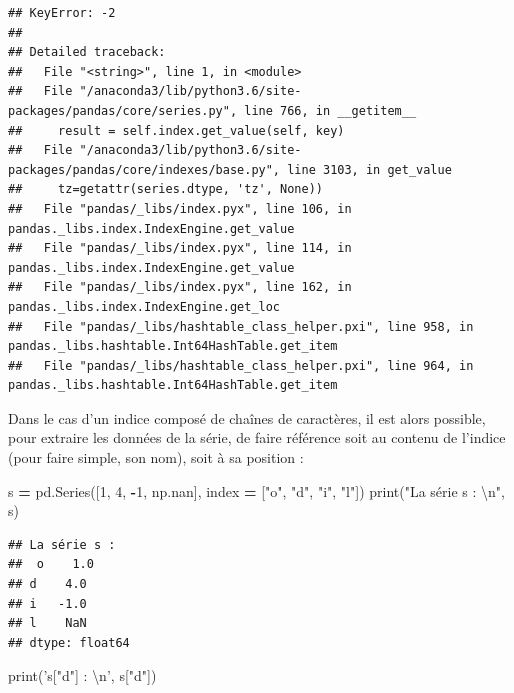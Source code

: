\documentclass[12pt,]{book}
\newenvironment{Shaded}{\begin{snugshade}}{\end{snugshade}}
\newcommand{\DecValTok}[1]{\textcolor[rgb]{0.00,0.00,0.81}{#1}}
\newcommand{\CharTok}[1]{\textcolor[rgb]{0.31,0.60,0.02}{#1}}
\newcommand{\StringTok}[1]{\textcolor[rgb]{0.31,0.60,0.02}{#1}}
\newcommand{\OperatorTok}[1]{\textcolor[rgb]{0.81,0.36,0.00}{\textbf{#1}}}
\newcommand{\BuiltInTok}[1]{#1}
\newcommand{\NormalTok}[1]{#1}
\numberwithin{equation}{section}
\numberwithin{countremarque}{section}
\begin{document}
\begin{lstlisting}
## KeyError: -2
## 
## Detailed traceback: 
##   File "<string>", line 1, in <module>
##   File "/anaconda3/lib/python3.6/site-packages/pandas/core/series.py", line 766, in __getitem__
##     result = self.index.get_value(self, key)
##   File "/anaconda3/lib/python3.6/site-packages/pandas/core/indexes/base.py", line 3103, in get_value
##     tz=getattr(series.dtype, 'tz', None))
##   File "pandas/_libs/index.pyx", line 106, in pandas._libs.index.IndexEngine.get_value
##   File "pandas/_libs/index.pyx", line 114, in pandas._libs.index.IndexEngine.get_value
##   File "pandas/_libs/index.pyx", line 162, in pandas._libs.index.IndexEngine.get_loc
##   File "pandas/_libs/hashtable_class_helper.pxi", line 958, in pandas._libs.hashtable.Int64HashTable.get_item
##   File "pandas/_libs/hashtable_class_helper.pxi", line 964, in pandas._libs.hashtable.Int64HashTable.get_item
\end{lstlisting}

Dans le cas d'un indice composé de chaînes de caractères, il est alors
possible, pour extraire les données de la série, de faire référence soit
au contenu de l'indice (pour faire simple, son nom), soit à sa position
:

\begin{Shaded}
\begin{Highlighting}[]
\NormalTok{s }\OperatorTok{=}\NormalTok{ pd.Series([}\DecValTok{1}\NormalTok{, }\DecValTok{4}\NormalTok{, }\OperatorTok{-}\DecValTok{1}\NormalTok{, np.nan],}
\NormalTok{             index }\OperatorTok{=}\NormalTok{ [}\StringTok{"o"}\NormalTok{, }\StringTok{"d"}\NormalTok{, }\StringTok{"i"}\NormalTok{, }\StringTok{"l"}\NormalTok{])}
\BuiltInTok{print}\NormalTok{(}\StringTok{"La série s : }\CharTok{\textbackslash{}n}\StringTok{"}\NormalTok{, s)}
\end{Highlighting}
\end{Shaded}

\begin{lstlisting}
## La série s : 
##  o    1.0
## d    4.0
## i   -1.0
## l    NaN
## dtype: float64
\end{lstlisting}

\begin{Shaded}
\begin{Highlighting}[]
\BuiltInTok{print}\NormalTok{(}\StringTok{'s["d"] : }\CharTok{\textbackslash{}n}\StringTok{'}\NormalTok{, s[}\StringTok{"d"}\NormalTok{])}
\end{Highlighting}
\end{Shaded}
\end{document}
